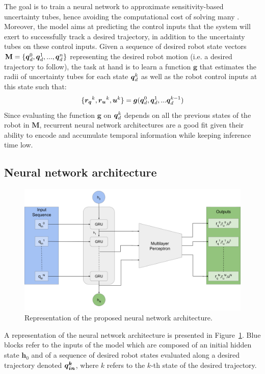 The goal is to train a neural network to approximate sensitivity-based uncertainty tubes, hence avoiding the computational cost of solving many . 
Moreover, the model aims at predicting the control inputs that the system will exert to successfully track a desired trajectory, in addition to the uncertainty tubes on these control inputs. 
Given a sequence of desired robot state vectors $\textbf{M} = \{\boldsymbol{q}_{d}^0, \boldsymbol{q}_{d}^1, ..., \boldsymbol{q}_{d}^n\}$ representing the desired robot motion (i.e. a desired trajectory to follow), the task at hand is to learn a function $\boldsymbol{g}$ that estimates the radii of uncertainty tubes for each state $\boldsymbol{q}_{d}^k$ as well as the robot control inputs at this state such that:
\begin{equation}\label{eq:prob_statement}
\{\boldsymbol{r_q}^{k}, \boldsymbol{r_u}^{k},\boldsymbol{u}^{k}\} = \boldsymbol{g}(\boldsymbol{q}_{d}^0, \boldsymbol{q}_{d}^1, ... \boldsymbol{q}_{d}^{k-1})
\end{equation}
Since evaluating the function $\boldsymbol{g}$ on $\boldsymbol{q}_{d}^k$ depends on all the previous states of the robot in $\textbf{M}$, recurrent neural network architectures are a good fit given their ability to encode and accumulate temporal information while keeping inference time low.

\subsection{Neural network architecture}\label{sec:architecture}

\begin{figure} [t]
    \centering
    \includegraphics[width=0.8\linewidth]{figures/learning_quadrotor/SensiNN_GRU.png}%
    \caption{Representation of the proposed neural network architecture.
    }%
    \label{fig: NN}%
\end{figure}

A representation of the neural network architecture is presented in Figure~\ref{fig: NN}.
Blue blocks refer to the inputs of the model which are composed of an initial hidden state $\boldsymbol{h}_{0}$ and of a sequence of desired robot states evaluated along a desired trajectory denoted $\boldsymbol{\boldsymbol{q}_{in}^k}$, where $k$ refers to the $k$-th state of the desired trajectory. 

